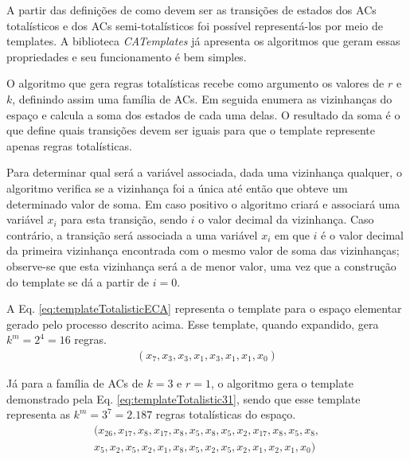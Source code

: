 A partir das definições de como devem ser as transições de estados dos ACs totalísticos e dos ACs semi-totalísticos foi possível representá-los por meio de templates. A biblioteca \textit{CATemplates} já apresenta os algoritmos que geram essas propriedades e seu funcionamento é bem simples. 

O algoritmo que gera regras totalísticas recebe como argumento os valores de $r$ e $k$, definindo assim uma família de ACs. Em seguida enumera as vizinhanças do espaço e calcula a soma dos estados de cada uma delas. O resultado da soma é o que define quais transições devem ser iguais para que o template represente apenas regras totalísticas.

Para determinar qual será a variável associada, dada uma vizinhança qualquer, o algoritmo verifica se a vizinhança foi a única até então que obteve um determinado valor de soma. Em caso positivo o algoritmo criará e associará uma variável $x_i$ para esta transição, sendo $i$ o valor decimal da vizinhança. Caso contrário, a transição será associada a uma variável $x_i$ em que $i$ é o valor decimal da primeira vizinhança encontrada com o mesmo valor de soma das vizinhanças; observe-se que esta vizinhança será a de menor valor, uma vez que a construção do template se dá a partir de $i=0$.

A Eq. \eqref{eq:templateTotalisticECA} representa o template para o espaço elementar gerado pelo processo descrito acima. Esse template, quando expandido, gera $k^m = 2^4 = 16$ regras.
\begin{equation}
\begin{split}
(x_7,x_3,x_3,x_1,x_3,x_1,x_1,x_0)
\label{eq:templateTotalisticECA}
\end{split}
\end{equation}

Já para a família de ACs de $k=3$ e $r=1$, o algoritmo gera o template demonstrado pela Eq. \eqref{eq:templateTotalistic31}, sendo que esse template representa as $k^m = 3^7 = 2.187$ regras totalísticas do espaço.
\begin{equation}
\begin{split}
(x_{26},x_{17},x_8,x_{17},x_8,x_5,x_8,x_5,x_2,x_{17},x_8,x_5,x_8,\\
x_5,x_2,x_5,x_2,x_1,x_8,x_5,x_2,x_5,x_2,x_1,x_2,x_1,x_0)
\label{eq:templateTotalistic31}
\end{split}
\end{equation}

